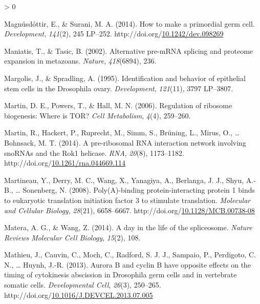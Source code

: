 \documentclass[12pt,oneside]{reedthesis}
\newlength{\cslhangindent}
\newenvironment{CSLReferences}[2] %
 {%
  \setlength{\parindent}{0pt}
  \ifodd #1 \everypar{\setlength{\hangindent}{\cslhangindent}}\ignorespaces\fi
  \ifnum #2 > 0
  \setlength{\parskip}{#2\baselineskip}
  \fi
 }%
 {}
\begin{document}
\begin{CSLReferences}{1}{0}
\leavevmode\hypertarget{ref-Magnusdottir2014d}{}%
Magnúsdóttir, E., \& Surani, M. A. (2014). How to make a primordial germ cell. \emph{Development}, \emph{141}(2), 245 LP--252. http://doi.org/\href{https://doi.org/10.1242/dev.098269}{10.1242/dev.098269}

\leavevmode\hypertarget{ref-Maniatis2002}{}%
Maniatis, T., \& Tasic, B. (2002). Alternative pre-{mRNA} splicing and proteome expansion in metazoans. \emph{Nature}, \emph{418}(6894), 236.

\leavevmode\hypertarget{ref-Margolis1995a}{}%
Margolis, J., \& Spradling, A. (1995). Identification and behavior of epithelial stem cells in the {Drosophila} ovary. \emph{Development}, \emph{121}(11), 3797 LP--3807.

\leavevmode\hypertarget{ref-Martin2006a}{}%
Martin, D. E., Powers, T., \& Hall, M. N. (2006). Regulation of ribosome biogenesis: Where is {TOR}? \emph{Cell Metabolism}, \emph{4}(4), 259--260.

\leavevmode\hypertarget{ref-martinPreribosomalRNAInteraction2014}{}%
Martin, R., Hackert, P., Ruprecht, M., Simm, S., Brüning, L., Mirus, O., \ldots{} Bohnsack, M. T. (2014). A pre-ribosomal {RNA} interaction network involving {snoRNAs} and the {Rok1} helicase. \emph{RNA}, \emph{20}(8), 1173--1182. http://doi.org/\href{https://doi.org/10.1261/rna.044669.114}{10.1261/rna.044669.114}

\leavevmode\hypertarget{ref-Martineau2008c}{}%
Martineau, Y., Derry, M. C., Wang, X., Yanagiya, A., Berlanga, J. J., Shyu, A.-B., \ldots{} Sonenberg, N. (2008). Poly({A})-binding protein-interacting protein 1 binds to eukaryotic translation initiation factor 3 to stimulate translation. \emph{Molecular and Cellular Biology}, \emph{28}(21), 6658--6667. http://doi.org/\href{https://doi.org/10.1128/MCB.00738-08}{10.1128/MCB.00738-08}

\leavevmode\hypertarget{ref-Matera2014}{}%
Matera, A. G., \& Wang, Z. (2014). A day in the life of the spliceosome. \emph{Nature Reviews Molecular Cell Biology}, \emph{15}(2), 108.

\leavevmode\hypertarget{ref-Mathieu2013d}{}%
Mathieu, J., Cauvin, C., Moch, C., Radford, S. J. J., Sampaio, P., Perdigoto, C. N., \ldots{} Huynh, J.-R. (2013). Aurora {B} and cyclin {B} have opposite effects on the timing of cytokinesis abscission in {Drosophila} germ cells and in vertebrate somatic cells. \emph{Developmental Cell}, \emph{26}(3), 250--265. http://doi.org/\href{https://doi.org/10.1016/J.DEVCEL.2013.07.005}{10.1016/J.DEVCEL.2013.07.005}


\end{CSLReferences}
\end{document}
